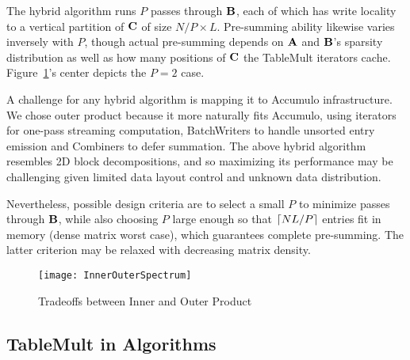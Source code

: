 The hybrid algorithm runs $P$ passes through $\mathbf{B}$,
each of which has write locality to a vertical partition of $\mathbf{C}$ of size $N/P \times L$.
Pre-summing ability likewise varies inversely with $P$, 
though actual pre-summing depends on
$\mathbf{A}$ and $\mathbf{B}$'s  sparsity distribution
as well as how many positions of $\mathbf{C}$ the TableMult iterators cache.
Figure~\ref{fInnerOuterSpectrum}'s center depicts the $P=2$ case.




A challenge for any hybrid algorithm is mapping it to Accumulo infrastructure.
We chose outer product because it more naturally fits Accumulo, 
using iterators for one-pass streaming computation, 
BatchWriters to handle unsorted entry emission and Combiners to defer summation.
The above hybrid algorithm resembles 2D block decompositions,
and so maximizing its performance may be challenging 
given limited data layout control and unknown data distribution.


Nevertheless, possible design criteria are to select a small $P$ to minimize passes through $\mathbf{B}$,
while also choosing $P$ large enough so that $\lceil NL/P\rceil$ entries fit in memory
(dense matrix worst case), which guarantees complete pre-summing.
The latter criterion may be relaxed with decreasing matrix density.

\begin{figure}[b]
\centering
\texttt{[image: InnerOuterSpectrum]}
\caption{Tradeoffs between Inner and Outer Product}
\label{fInnerOuterSpectrum}
\end{figure}

\subsection{TableMult in Algorithms}

